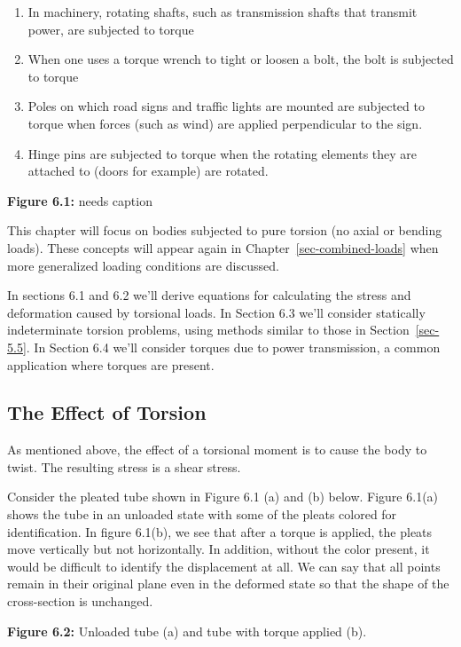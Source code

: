 \documentclass[
  letterpaper,
  DIV=11,
  numbers=noendperiod]{scrreprt}
\providecommand{\tightlist}{%
  \setlength{\itemsep}{0pt}\setlength{\parskip}{0pt}}\usepackage{longtable,booktabs,array}
\theoremstyle{definition}
\theoremstyle{remark}
\begin{document}
\begin{enumerate}
\def\labelenumi{\arabic{enumi}.}
\tightlist
\item
  In machinery, rotating shafts, such as transmission shafts that
  transmit power, are subjected to torque
\item
  When one uses a torque wrench to tight or loosen a bolt, the bolt is
  subjected to torque
\item
  Poles on which road signs and traffic lights are mounted are subjected
  to torque when forces (such as wind) are applied perpendicular to the
  sign.
\item
  Hinge pins are subjected to torque when the rotating elements they are
  attached to (doors for example) are rotated.
\end{enumerate}

\textbf{Figure 6.1:} needs caption

This chapter will focus on bodies subjected to pure torsion (no axial or
bending loads). These concepts will appear again in
Chapter~\ref{sec-combined-loads} when more generalized loading
conditions are discussed.

In sections 6.1 and 6.2 we'll derive equations for calculating the
stress and deformation caused by torsional loads. In Section 6.3 we'll
consider statically indeterminate torsion problems, using methods
similar to those in Section~\ref{sec-5.5}. In Section 6.4 we'll consider
torques due to power transmission, a common application where torques
are present.

\subsection{The Effect of Torsion}\label{the-effect-of-torsion}

As mentioned above, the effect of a torsional moment is to cause the
body to twist. The resulting stress is a shear stress.

Consider the pleated tube shown in Figure 6.1 (a) and (b) below. Figure
6.1(a) shows the tube in an unloaded state with some of the pleats
colored for identification. In figure 6.1(b), we see that after a torque
is applied, the pleats move vertically but not horizontally. In
addition, without the color present, it would be difficult to identify
the displacement at all. We can say that all points remain in their
original plane even in the deformed state so that the shape of the
cross-section is unchanged.

\textbf{Figure 6.2:} Unloaded tube (a) and tube with torque applied (b).
\end{document}
